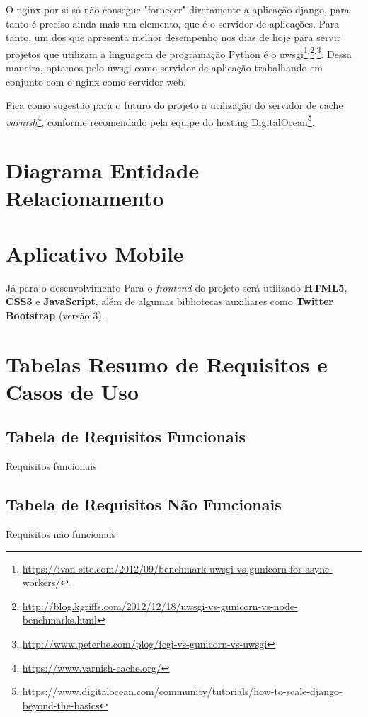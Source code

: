 O \gls{nginx} por si só não consegue "fornecer" diretamente a aplicação django, para tanto é preciso ainda mais um elemento, que é o servidor de aplicações. Para tanto, um dos que apresenta melhor desempenho nos dias de hoje para servir projetos que utilizam a linguagem de programação Python é o \gls{uwsgi}\footnote{\url{https://ivan-site.com/2012/09/benchmark-uwsgi-vs-gunicorn-for-async-workers/}}$^,$\footnote{\url{http://blog.kgriffs.com/2012/12/18/uwsgi-vs-gunicorn-vs-node-benchmarks.html}}$^,$\footnote{\url{http://www.peterbe.com/plog/fcgi-vs-gunicorn-vs-uwsgi}}. Dessa maneira, optamos pelo \gls{uwsgi} como servidor de aplicação trabalhando em conjunto com o \gls{nginx} como servidor web.

Fica como sugestão para o futuro do projeto a utilização do servidor de cache \textit{varnish}\footnote{\url{https://www.varnish-cache.org/}}, conforme recomendado pela equipe do hosting DigitalOcean\footnote{\url{https://www.digitalocean.com/community/tutorials/how-to-scale-django-beyond-the-basics}}.

\section{Diagrama Entidade Relacionamento}




\section{Aplicativo Mobile}\label{sec:spec-appmobile}

Já para o desenvolvimento Para o \textit{frontend} do projeto será utilizado \textbf{HTML5}, \textbf{CSS3} e \textbf{JavaScript}, além de algumas bibliotecas auxiliares como \textbf{Twitter Bootstrap} (versão 3).







\section{Tabelas Resumo de Requisitos e Casos de Uso}
\subsection{Tabela de Requisitos Funcionais}\label{subsec:tabResReqF}
   \begin{table}[H]
        \centering
        \caption{Requisitos funcionais}
        \label{tab:reqFunc}
        \PrintRequisitosFunc
    \end{table}
    

\subsection{Tabela de Requisitos Não Funcionais}\label{subsec:tabResReqNF}
   \begin{table}[H]
        \centering
        \caption{Requisitos não funcionais}
        \label{tab:reqNFunc}
        \PrintRequisitosNFunc
    \end{table}

